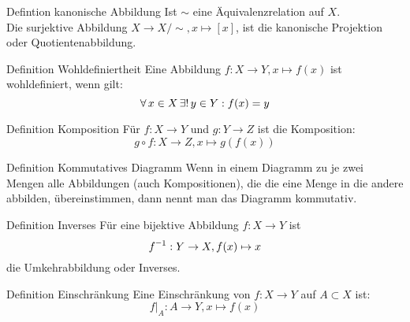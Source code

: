 \documentclass[main.tex]{subfiles}
\begin{document}
\begin{karte}{Defintion kanonische Abbildung}
    Ist \( \sim \) eine Äquivalenzrelation auf \(X\). \\
    Die surjektive Abbildung \(X \rightarrow X/\sim, x \mapsto [x]\), 
    ist die kanonische Projektion oder Quotientenabbildung. 
\end{karte}
\begin{karte}{Definition Wohldefiniertheit}
    Eine Abbildung \( f: X \rightarrow Y, 
    x \mapsto f(x) \) ist wohldefiniert, 
    wenn gilt:
    \[ \forall \, x \in X \, \exists! \, y \in Y: f(x) = y \]
\end{karte}
\begin{karte}{Definition Komposition}
    Für \( f: X \rightarrow Y \) und 
    \( g: Y \rightarrow Z \) ist die Komposition:
    \[ g \circ f : X \rightarrow Z, x \mapsto g(f(x)) \]
\end{karte}
\begin{karte}{Definition Kommutatives Diagramm}
    Wenn in einem Diagramm zu je zwei Mengen alle Abbildungen 
    (auch Kompositionen), die die eine Menge in die andere abbilden,
    übereinstimmen, dann nennt man das Diagramm kommutativ. 
\end{karte}
\begin{karte}{Definition Inverses}
    Für eine bijektive Abbildung \( f: X \rightarrow Y \) ist
    \[ \inverse{f}: Y \rightarrow X, f(x) \mapsto x \] 
    die Umkehrabbildung oder Inverses.
\end{karte}
\begin{karte}{Definition Einschränkung}
    Eine Einschränkung von \(f: X \rightarrow Y\) 
    auf \(A \subset X\) ist:
    \[f \vert_A : A \rightarrow Y, x \mapsto f(x)\]
\end{karte}
\end{document}
